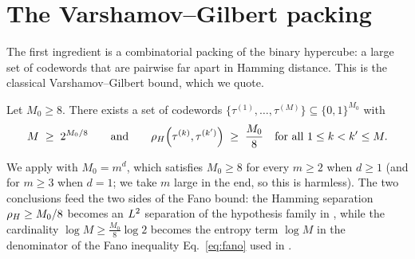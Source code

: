 \section{The Varshamov--Gilbert packing}\label{sec:vg}

The first ingredient is a combinatorial packing of the binary hypercube: a
large set of codewords that are pairwise far apart in Hamming distance. This
is the classical Varshamov--Gilbert bound, which we quote.

\begin{lemma}\label{lem:vg}
Let $M_0\ge 8$. There exists a set of codewords
$\{\tau^{(1)},\dots,\tau^{(M)}\}\subseteq\{0,1\}^{M_0}$ with
\begin{align}\label{eq:vg}
M \;\ge\; 2^{M_0/8}
\qquad\text{and}\qquad
\rho_{H}\!\left(\tau^{(k)},\tau^{(k')}\right) \;\ge\; \frac{M_0}{8}
\quad\text{for all } 1\le k< k'\le M.
\end{align}
\end{lemma}

\begin{remark}\label{rem:vg}
We apply  with $M_0 = m^d$, which satisfies $M_0\ge 8$ for every
$m\ge 2$ when $d\ge 1$ (and for $m\ge 3$ when $d=1$; we take $m$ large in the
end, so this is harmless). The two conclusions feed the two sides of the Fano
bound: the Hamming separation $\rho_{H}\ge M_0/8$ becomes an $L^{2}$ separation
of the hypothesis family in , while the cardinality
$\log M\ge \tfrac{M_0}{8}\log 2$ becomes the entropy term $\log M$ in the
denominator of the Fano inequality Eq.~\eqref{eq:fano} used in
.
\end{remark}
